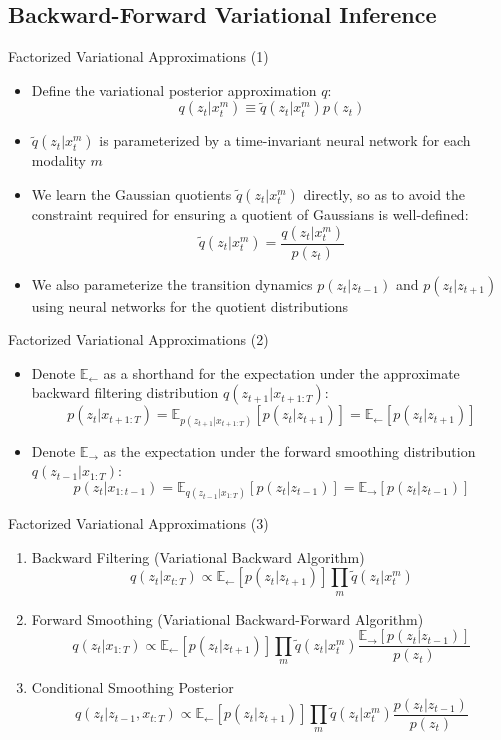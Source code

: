 \documentclass{beamer}
\begin{document}
\subsection{Backward-Forward Variational Inference}
\begin{frame}{Factorized Variational Approximations (1)}
\begin{itemize}
\item Define the variational posterior approximation $q$:\[
q(z_t|x_t^m)\equiv\tilde{q}(z_t|x_t^m)p(z_t)
\]
\item $\tilde{q}(z_t|x_t^m)$ is parameterized by a time-invariant neural network for each modality $m$
\item We learn the Gaussian quotients $\tilde{q}(z_t|x_t^m)$ directly, so as to avoid the constraint required for ensuring a quotient of Gaussians is well-defined:\[
\tilde{q}(z_t|x_t^m)=\frac{q(z_t|x_t^m)}{p(z_t)}
\]
\item We also parameterize the transition dynamics $p(z_t|z_{t-1})$ and $p(z_t|z_{t+1})$ using neural networks for the quotient distributions
\end{itemize}
\end{frame}
\begin{frame}{Factorized Variational Approximations (2)}
\begin{itemize}
\item Denote $\mathbb{E}_\leftarrow$ as a shorthand for the expectation under the approximate backward filtering distribution $q(z_{t+1}|x_{t+1:T})$:\[
p(z_t|x_{t+1:T})=\mathbb{E}_{p(z_{t+1}|x_{t+1:T})}[p(z_t|z_{t+1})]=\mathbb{E}_\leftarrow[p(z_t|z_{t+1})]
\]
\item Denote $\mathbb{E}_\to$ as the expectation under the forward smoothing distribution $q(z_{t-1}|x_{1:T})$:\[
p(z_t|x_{1:t-1})=\mathbb{E}_{q(z_{t-1}|x_{1:T})}[p(z_t|z_{t-1})]=\mathbb{E}_\to[p(z_t|z_{t-1})]
\]
\end{itemize}
\end{frame}
\begin{frame}{Factorized Variational Approximations (3)}
\begin{enumerate}
\item Backward Filtering (Variational Backward Algorithm)\[
q(z_t|x_{t:T})\propto\mathbb{E}_\leftarrow[p(z_t|z_{t+1})]\prod_m\tilde{q}(z_t|x_t^m)
\]
\item Forward Smoothing (Variational Backward-Forward Algorithm)\[
q(z_t|x_{1:T})\propto\mathbb{E}_\leftarrow[p(z_t|z_{t+1})]\prod_m\tilde{q}(z_t|x_t^m)\frac{\mathbb{E}_\to[p(z_t|z_{t-1})]}{p(z_t)}
\]
\item Conditional Smoothing Posterior\[
q(z_t|z_{t-1},x_{t:T})\propto\mathbb{E}_\leftarrow[p(z_t|z_{t+1})]\prod_m\tilde{q}(z_t|x_t^m)\frac{p(z_t|z_{t-1})}{p(z_t)}
\]
\end{enumerate}
\end{frame}
\end{document}
